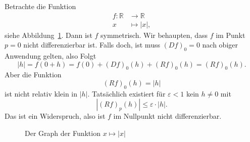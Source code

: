\documentclass[../main.tex]{subfiles}
\begin{document}
\begin{example}
  Betrachte die Funktion
  \begin{align*}
    f \colon \mathbb{R} & \to \mathbb{R} \\
    x & \mapsto |x|,
  \end{align*}
  siehe Abbildung~\ref{fig:modulus}.
  Dann ist $f$ symmetrisch. Wir behaupten, dass
  $f$ im Punkt $p = 0$ nicht differenzierbar ist.
  Falls doch, ist muss ${(Df)}_0 = 0$ nach obiger
  Anwendung gelten, also
  Folgt
  \[
    |h| = f(0 + h) = f(0) + {(Df)}_0(h) + {(Rf)}_0(h)
    = {(Rf)}_0(h).
  \]
  Aber die Funktion
  \[
    {(Rf)}_0(h) = |h|
  \]
  ist nicht relativ klein in $|h|$. Tatsächlich existiert
  für $\varepsilon < 1$ kein $h \neq 0$ mit
  \[
    |{(Rf)}_p(h)| \leq \varepsilon \cdot |h|.
  \]
  Das ist ein Widerspruch, also ist $f$ im Nullpunkt
  nicht differenzierbar.
\end{example}

\begin{figure}[htb]
  \centering
  
  \caption{Der Graph der Funktion $x \mapsto |x|$}%
  \label{fig:modulus}
\end{figure}
\end{document}
